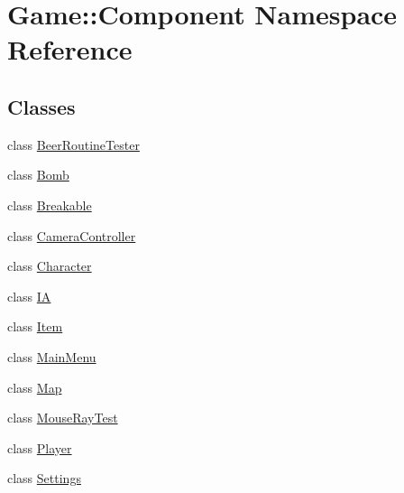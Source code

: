 \hypertarget{namespace_game_1_1_component}{}\section{Game\+:\+:Component Namespace Reference}
\label{namespace_game_1_1_component}
\subsection*{Classes}
\begin{DoxyCompactItemize}
\item 
class \mbox{\hyperlink{class_game_1_1_component_1_1_beer_routine_tester}{Beer\+Routine\+Tester}}
\item 
class \mbox{\hyperlink{class_game_1_1_component_1_1_bomb}{Bomb}}
\item 
class \mbox{\hyperlink{class_game_1_1_component_1_1_breakable}{Breakable}}
\item 
class \mbox{\hyperlink{class_game_1_1_component_1_1_camera_controller}{Camera\+Controller}}
\item 
class \mbox{\hyperlink{class_game_1_1_component_1_1_character}{Character}}
\item 
class \mbox{\hyperlink{class_game_1_1_component_1_1_i_a}{IA}}
\item 
class \mbox{\hyperlink{class_game_1_1_component_1_1_item}{Item}}
\item 
class \mbox{\hyperlink{class_game_1_1_component_1_1_main_menu}{Main\+Menu}}
\item 
class \mbox{\hyperlink{class_game_1_1_component_1_1_map}{Map}}
\item 
class \mbox{\hyperlink{class_game_1_1_component_1_1_mouse_ray_test}{Mouse\+Ray\+Test}}
\item 
class \mbox{\hyperlink{class_game_1_1_component_1_1_player}{Player}}
\item 
class \mbox{\hyperlink{class_game_1_1_component_1_1_settings}{Settings}}
\end{DoxyCompactItemize}
